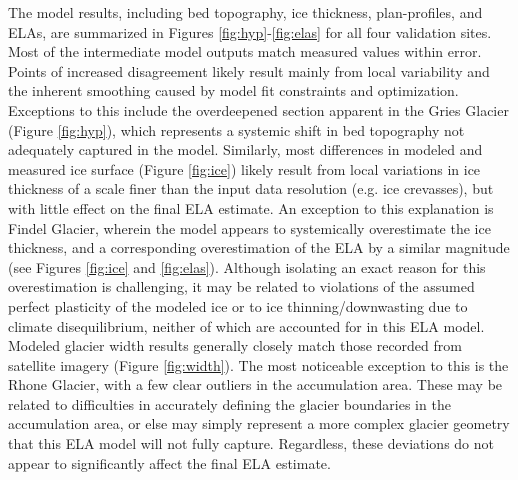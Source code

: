 \documentclass[review]{elsarticle}
\begin{document}
The model results, including bed topography, ice thickness, plan-profiles, and ELAs, are summarized in Figures \ref{fig:hyp}-\ref{fig:elas} for all four validation sites.
Most of the intermediate model outputs match measured values within error.
Points of increased disagreement likely result mainly from local variability and the inherent smoothing caused by model fit constraints and optimization.
Exceptions to this include the overdeepened section apparent in the Gries Glacier (Figure \ref{fig:hyp}), which represents a systemic shift in bed topography not adequately captured in the model.
Similarly, most differences in modeled and measured ice surface (Figure \ref{fig:ice}) likely result from local variations in ice thickness of a scale finer than the input data resolution (e.g. ice crevasses), but with little effect on the final ELA estimate.
An exception to this explanation is Findel Glacier, wherein the model appears to systemically overestimate the ice thickness, and a corresponding overestimation of the ELA by a similar magnitude (see Figures \ref{fig:ice} and \ref{fig:elas}).
Although isolating an exact reason for this overestimation is challenging, it may be related to violations of the assumed perfect plasticity of the modeled ice or to ice thinning/downwasting due to climate disequilibrium, neither of which are accounted for in this ELA model.
Modeled glacier width results generally closely match those recorded from satellite imagery (Figure \ref{fig:width}).
The most noticeable exception to this is the Rhone Glacier, with a few clear outliers in the accumulation area.
These may be related to difficulties in accurately defining the glacier boundaries in the accumulation area, or else may simply represent a more complex glacier geometry that this ELA model will not fully capture.
Regardless, these deviations do not appear to significantly affect the final ELA estimate.
\end{document}
